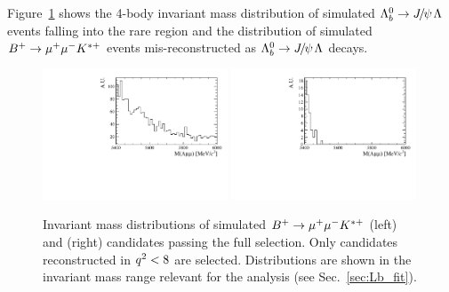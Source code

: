 Figure~\ref{fig:peakingBkgs} shows the 4-body invariant mass distribution of simulated $\Lb\ra\jpsi\Lz$
events falling into the rare \qsq region and the distribution of simulated $B^{+} \rightarrow{\ensuremath{\mu^+\mu^-}} K^{*+}$
events mis-reconstructed as $\Lb\ra\jpsi\Lz$ decays.
%
\begin{figure}
\centering
\includegraphics[width=0.49\textwidth]{Lmumu/figs/Bu2Kstplus_mass.pdf}
\includegraphics[width=0.49\textwidth]{Lmumu/figs/JpsiL_leakage_mass.pdf}
\caption{ Invariant mass distributions of simulated $B^{+} \rightarrow{\ensuremath{\mu^+\mu^-}} K^{*+}$ (left)
and \Lb\to\jpsi\Lz (right) candidates passing the full selection. Only \Lb\to\jpsi\Lz
candidates reconstructed in ${q^2} < 8$ \gevgevcccc are selected.
Distributions are shown in the invariant mass range relevant for the analysis 
(see Sec.~\ref{sec:Lb_fit}). }
\label{fig:peakingBkgs}
\end{figure}

